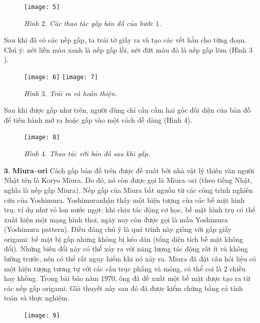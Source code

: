 \begin{multicols}{2}
\begin{figure}[H]
		\vspace*{4pt}
		\texttt{[image: 5]}
		\caption{\small\textit{\color{toanhocdoisong}Hình $2$. Các thao tác gấp bản đồ của bước $1$.}}
		\vspace*{-5pt}
	\end{figure}
	Sau khi đã có các nếp gấp, ta trải tờ giấy ra và tạo các vết hằn cho từng đoạn. Chú ý: nét liền màu xanh là nếp gấp lồi, nét đứt màu đỏ là nếp gấp lõm (Hình $3$).
	\begin{figure}[H]
		\vspace*{-5pt}
		\centering
		\captionsetup{labelformat= empty, justification=centering}
		\texttt{[image: 6]}\hspace*{3pt}
		\texttt{[image: 7]}
		\caption{\small\textit{\color{toanhocdoisong}Hình $3$. Trải ra và hoàn thiện.}}
		\vspace*{-10pt}
	\end{figure}
	Sau khi được gấp như trên, người dùng chỉ cần cầm hai góc đối diện của bản đồ để tiến hành mở ra hoặc gấp vào một cách dễ dàng (Hình $4$). 
	\begin{figure}[H]
		\vspace*{-5pt}
		\centering
		\captionsetup{labelformat= empty, justification=centering}
		\texttt{[image: 8]}
		\caption{\small\textit{\color{toanhocdoisong}Hình $4$. Thao tác với bản đồ sau khi gấp.}}
		\vspace*{-10pt}
	\end{figure}
	$\pmb{3.}$ \textbf{\color{toanhocdoisong}Miura--ori}
	\vskip 0.1cm
	Cách gấp bản đồ trên được đề xuất bởi nhà vật lý thiên văn người Nhật tên là Koryo Miura. Do đó, nó còn được gọi là Miura--ori (theo tiếng Nhật, nghĩa là nếp gấp Miura).
	\vskip 0.1cm
	Nếp gấp của Miura bắt nguồn từ các công trình nghiên cứu của Yoshimura. Yoshimura\linebreak nhận thấy một hiện tượng của các bề mặt hình trụ, ví dụ như vỏ lon nước ngọt: khi chịu tác động cơ học, bề mặt  hình trụ có thể xuất hiện một mạng hình thoi, ngày nay còn được gọi là mẫu Yoshimura (Yoshimura pattern). Điều đáng chú ý là quá trình này giống với gấp giấy origami: bề mặt bị gấp nhưng không bị kéo dãn (tổng diện tích bề mặt không đổi). Những biến đổi này có thể xảy ra với năng lượng tác động rất ít và không lường trước, nên có thể rất nguy hiểm khi nó xảy ra.
	\vskip 0.1cm
	Miura đã đặt câu hỏi liệu có một hiện tượng tương tự với các cấu trục phẳng và mỏng, có thể coi là $2$ chiều hay không. Trong bài báo năm $1970$, ông đã đề xuất một bề mặt được tạo ra từ các nếp gấp origami. Giả thuyết này sau đó đã được kiểm chứng bằng cả tính toán và thực nghiệm.
	\begin{figure}[H]
		\vspace*{-5pt}
		\centering
		\captionsetup{labelformat= empty, justification=centering}
		\texttt{[image: 9]}
		

\end{figure}
\end{multicols}
